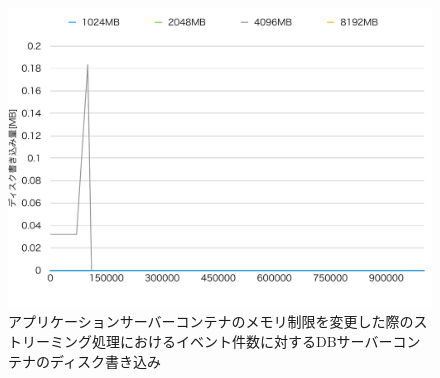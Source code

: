 \documentclass[../../../../../main]{subfiles}
\begin{document}
    \begin{figure}[H]
        \centering
        \includegraphics[width=12cm]{graph}
        \caption{アプリケーションサーバーコンテナのメモリ制限を変更した際のストリーミング処理におけるイベント件数に対するDBサーバーコンテナのディスク書き込み}
        \label{fig:stream-change-app-memory-limit-db-disk-in-app_4_db_1_1024}
    \end{figure}
\end{document}
